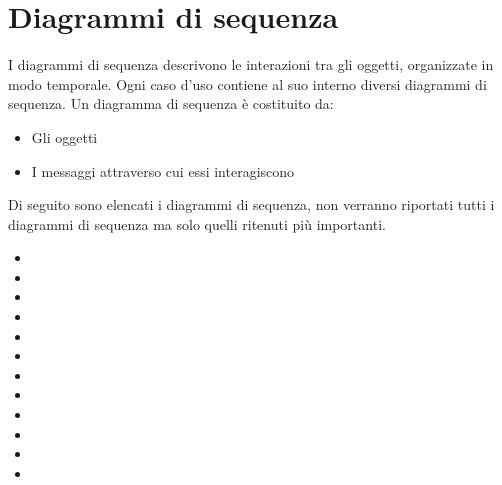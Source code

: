 \section{Diagrammi di sequenza}  \label{cha:sequenza}
I diagrammi di sequenza descrivono le interazioni tra gli oggetti, organizzate in modo temporale. Ogni caso d’uso contiene al suo interno diversi diagrammi di sequenza.
Un diagramma di sequenza è costituito da:
\begin{itemize}
	\item Gli oggetti
	\item I messaggi attraverso cui essi interagiscono
\end{itemize}
Di seguito sono elencati i diagrammi di sequenza, non verranno riportati tutti i diagrammi di sequenza ma solo quelli ritenuti più importanti.
\begin{itemize}
	\item {}
	\item {}
	\item {}
	\item {}
	\item {}
	\item {}
	\item {}
	\item {}
	\item {}
	\item {}
	\item {}
	\item {}
\end{itemize}

